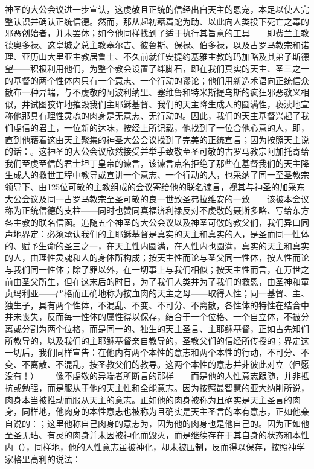 神圣的大公会议进一步宣认，这虔敬且正统的信经出自天主的恩宠，本足以使人完整认识并确认正统信德。然而，那从起初藉着蛇为助、以此向人类投下死亡之毒的邪恶创始者，并未罢休；如今他同样找到了适于执行其旨意的工具——即费兰主教德奥多禄、这皇城之总主教塞尔吉、彼鲁斯、保禄、伯多禄，以及古罗马教宗和诺理、亚历山大里亚主教居鲁士、不久前就任安提约基雅主教的玛加略及其弟子斯德望——积极利用他们，为整个教会设置了绊脚石，即在我们真实的天主、圣三之一的基督的两个性体内只有一个意志、一个行动的谬论；他们用新造术语向正统信众散布一种异端，与不虔敬的阿波利纳里、塞维鲁和特米斯提乌斯的疯狂邪恶教义相似，并试图狡诈地摧毁我们主耶稣基督、我们的天主降生成人的圆满性，亵渎地宣称他那具有理性灵魂的肉身是无意志、无行动的。因此，我们的天主基督兴起了我们虔信的君主，一位新的达味，按经上所记载，他找到了一位合他心意的人，即，直到他藉着这由天主聚集的神圣大公会议找到了完美的正统宣言；因为按照天主说的话：。这神圣的大公会议欣然接受并举手致敬至圣可敬的古罗马教宗阿加托寄给我们至虔至信的君士坦丁皇帝的谏言，该谏言点名拒绝了那些在基督我们的天主降生成人的救世工程中教导或宣讲一个意志、一个行动的人，也采纳了同一至圣教宗领导下、由125位可敬的主教组成的会议寄给他的联名谏言，视其与神圣的加采东大公会议及同一古罗马教宗至圣可敬的良一世致圣弗拉维安的一致——该被本会议称为正统信德的支柱——同时也赞同真福济利禄反对不虔敬的聂斯多略、写给东方各主教的联名信函。追随五个神圣的大公会议以及神圣可敬的教父们，我们异口同声地界定：必须承认我们的主耶稣基督是真实的天主和真实的人，是圣而同一性体的、赋予生命的圣三之一，在天主性内圆满，在人性内也圆满，真实的天主和真实的人，由理性灵魂和人的身体所构成；按天主性而论与圣父同一性体，按人性而论与我们同一性体；除了罪以外，在一切事上与我们相似；按天主性而言，在万世之前由圣父所生，但在这末后的时日，为了我们人类并为了我们的救恩，由圣神和童贞玛利亚——严格而正确地称为按血肉的天主之母——取得人性；同一基督、主、独生子，具有两个性体，不混乱、不变、不可分、不离散，各性体的特性在结合中并未丧失，反而每一性体的属性得以保存，结合于一个位格、一个自立体，不被分离或分割为两个位格，而是同一的、独生的天主圣言、主耶稣基督，正如古先知们所教导的，以及我们的主耶稣基督亲自教导的，圣教父们的信经所传授的；界定这一切后，我们同样宣告：在他内有两个本性的意志和两个本性的行动，不可分、不变、不离散、不混乱，按圣教父们的教导。这两个本性的意志并非彼此对立（但愿没有！）——像不虔敬的异端者所断言的那样——而是他的人性意志跟随，并非抵抗或勉强，而是服从于他的天主性和全能意志。因为按照最智慧的亚大纳削所说，肉身本当被推动而服从天主的意志。正如他的肉身被称为且确实是天主圣言的肉身，同样地，他肉身的本性意志也被称为且确实是天主圣言的本有意志，正如他亲自说的：；这里他称自己肉身的意志为，因为他的肉身也是他自己的。因为正如他至圣无玷、有灵的肉身并未因被神化而毁灭，而是继续存在于其自身的状态和本性内（），同样地，他的人性意志虽被神化，却未被压制，反而得以保存，按照神学家格里高利的说法：\par

